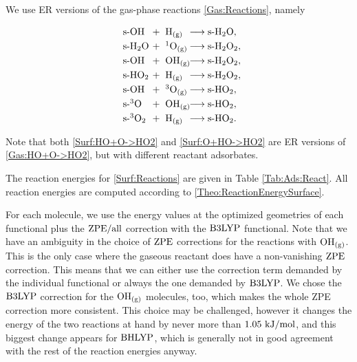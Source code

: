 We use ER versions of the gas-phase reactions \eqref{Gas:Reactions}, namely

\renewcommand\ronebox[1]{\makebox[1cm][l]{\enmat{#1}}}
\renewcommand\rtwobox[1]{\makebox[1.cm][l]{\ \enmat{#1}}}
\renewcommand\prodbox[1]{\makebox[1.65cm][l]{\enmat{#1}}}
\begin{subequations}
\begin{align}
   \label{Surf:HO+H->H2O}
   \ronebox{\sur\ho}+\rtwobox{\te{H}\gas}\prodbox{\chemar\sur\hto,} \\ 
   \label{Surf:H2O+O->H2O2}
   \ronebox{\sur\hto}+\rtwobox{\singo\gas}\prodbox{\chemar\sur\htot,} \\
   \label{Surf:HO+HO->H2O2}
   \ronebox{\sur\ho}+\rtwobox{\ho\gas}\prodbox{\chemar\sur\htot,} \\
   \label{Surf:HO2+H->H2O2}
   \ronebox{\sur\hot}+\rtwobox{\te{H}\gas}\prodbox{\chemar\sur\htot,} \\
   \label{Surf:HO+O->HO2}
   \ronebox{\sur\ho}+\rtwobox{\tripo\gas}\prodbox{\chemar\sur\hot,} \\
   \label{Surf:O+HO->HO2}
   \ronebox{\sur\tripo}+\rtwobox{\ho\gas}\prodbox{\chemar\sur\hot,} \\
   \label{Surf:3O2+H->HO2}
   \ronebox{\sur\tripot}+\rtwobox{\te{H}\gas}\prodbox{\chemar\sur\hot.}
\end{align}
\label{Surf:Reactions}
\end{subequations}

Note that both \eqref{Surf:HO+O->HO2} and \eqref{Surf:O+HO->HO2} are ER
versions of \eqref{Gas:HO+O->HO2}, but with different reactant adsorbates.

The reaction energies for \eqref{Surf:Reactions} are given in Table \ref{Tab:Ads:React}.
All reaction energies are computed according to \eqref{Theo:ReactionEnergySurface}.

For each molecule, we use the energy values at the optimized
geometries of each functional plus the $\text{ZPE}/\text{all}$ correction with the $\text{B3LYP}$ functional. Note that we have an ambiguity in the choice
of $\text{ZPE}$ corrections for the reactions with $\text O \text H_\text{(g)}$. This is the only
case where the gaseous reactant does have a non-vanishing $\text{ZPE}$ correction.
This means that we can either use the correction term demanded by the
individual functional or always the one demanded by $\text{B3LYP}$. We chose
the $\text{B3LYP}$ correction for the $\text O \text H_\text{(g)}$ molecules, too, which makes the whole
ZPE correction more consistent. This choice may be challenged, however it 
changes the energy of the two reactions at hand by never more than $1.05~\text {kJ/mol}$,
and this biggest change appears for $\text{BHLYP}$, which is generally not in good
agreement with the rest of the reaction energies anyway.


